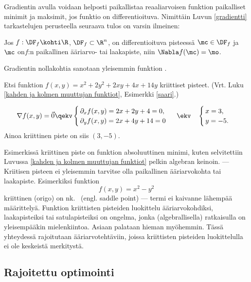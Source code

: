 Gradientin avulla voidaan helposti paikallistaa reaaliarvoisen funktion paikalliset minimit ja 
maksimit, jos funktio on differentioituva. Nimittäin Luvun \ref{gradientti} tarkastelujen 
perusteella seuraava tulos on varsin ilmeinen:
\begin{Prop} \label{ääriarvopropositio-Rn}
Jos $f:\DF_f\kohti\R$, $\DF_f\subset\R^n$, on differentioituva pisteessä $\mc\in\DF_f$ ja $\mc$
on$f$:n paikallinen ääriarvo- tai laakapiste, niin $\Nabla f(\mc)=\mo$.
\end{Prop}
%
Gradientin nollakohtia sanotaan yleisemmin funktion .
\begin{Exa} \label{saari uudelleen}
Etsi funktion $f(x,y)=x^2+2y^2+2xy+4x+14y$ kriittiset pisteet. 
(Vrt. Luku \ref{kahden ja kolmen muuttujan funktiot}, Esimerkki \ref{saari}.)
\end{Exa} 
\ratk 
\[
\nabla f(x,y)=\vec 0 \qekv \begin{cases} 
                           \,\partial_x f(x,y)= 2x+2y+4=0, \\ 
                           \,\partial_y f(x,y)= 2x+4y+14=0 
                           \end{cases}\ \ekv \quad \begin{cases} \,x=3, \\ \,y=-5. \end{cases}
\]
Ainoa kriittinen piste on siis $(3,-5)$. \loppu

Esimerkissä kriittinen piste on funktion absoluuttinen minimi, kuten selvitettiin Luvussa 
\ref{kahden ja kolmen muuttujan funktiot} pelkin algebran keinoin. --- Kriitisen pisteen
ei yleisemmin tarvitse olla paikallinen ääriarvokohta tai laakapiste. Esimerkiksi funktion
\[
f(x,y)=x^2-y^2
\]
%
kriittinen (origo) on nk.\  (engl. saddle point) --- termi ei kaivanne
lähempää määrittelyä. Funktion kriittisten pisteiden luokittelu ääriarvokohdiksi,
laakapisteiksi tai satulapisteiksi on ongelma, jonka (algebrallisella) ratkaisulla on
yleisempääkin mielenkiintoa. Asiaan palataan hieman myöhemmin. Tässä yhteydessä rajoitutaan
ääriarvotehtäviin, joissa kriittisten pisteiden luokittelulla ei ole keskeistä merkitystä.

\subsection{Rajoitettu optimointi} 

